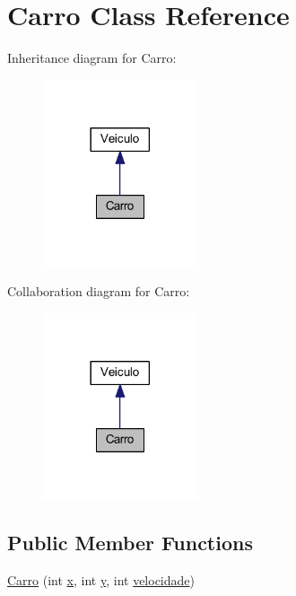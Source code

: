 \hypertarget{class_carro}{}\section{Carro Class Reference}
\label{class_carro}


Inheritance diagram for Carro\+:
\nopagebreak
\begin{figure}[H]
\begin{center}
\leavevmode
\includegraphics[width=129pt]{class_carro__inherit__graph}
\end{center}
\end{figure}


Collaboration diagram for Carro\+:
\nopagebreak
\begin{figure}[H]
\begin{center}
\leavevmode
\includegraphics[width=129pt]{class_carro__coll__graph}
\end{center}
\end{figure}
\subsection*{Public Member Functions}
\begin{DoxyCompactItemize}
\item 
\mbox{\hyperlink{class_carro_a5637631ba38ec32090b43e8932071695}{Carro}} (int \mbox{\hyperlink{class_veiculo_a069917a284297fe5b385258b2afd9ad6}{x}}, int \mbox{\hyperlink{class_veiculo_af25046404db7c2786c0d9e468bb1fb64}{y}}, int \mbox{\hyperlink{class_veiculo_a2edf5e3132b1c2504c441dc095dc7e0e}{velocidade}})
\end{DoxyCompactItemize}
